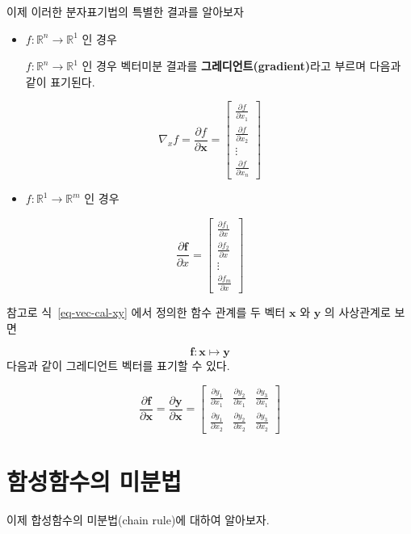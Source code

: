\documentclass[
  11pt,
  a4paper,
  oneside]{scrbook}
\providecommand{\tightlist}{%
  \setlength{\itemsep}{0pt}\setlength{\parskip}{0pt}}\usepackage{longtable,booktabs,array}
\newcommand{\RR}{\mathbb{R}}
\newcommand{\pardifftwo}[2]{\frac{\partial #1}{\partial #2 }}
\theoremstyle{definition}
\theoremstyle{plain}
\theoremstyle{definition}
\theoremstyle{definition}
\theoremstyle{remark}
\begin{document}
이제 이러한 분자표기법의 특별한 결과를 알아보자

\begin{itemize}
\item
  \(f: \RR^n \rightarrow \RR^1\) 인 경우

  \(f: \RR^n \rightarrow \RR^1\) 인 경우 벡터미분 결과를
  \textbf{그레디언트(gradient)}라고 부르며 다음과 같이 표기된다.
\end{itemize}

\[ 
\nabla_x f = \pardifftwo{ f}{\pmb x} = 
\begin{bmatrix} 
\pardifftwo{ f}{x_1} \\
\pardifftwo{ f}{x_2} \\
\vdots \\ 
\pardifftwo{ f}{x_n} 
\end{bmatrix} 
\]

\begin{itemize}
\tightlist
\item
  \(f: \RR^1 \rightarrow \RR^m\) 인 경우
\end{itemize}

\[ 
\pardifftwo{\pmb f}{x} = 
\begin{bmatrix} 
\pardifftwo{ f_1}{x} \\
\pardifftwo{ f_2}{x} \\
\vdots \\
\pardifftwo{ f_m}{x} 
\end{bmatrix} 
\]

참고로 식~\ref{eq-vec-cal-xy} 에서 정의한 함수 관계를 두 벡터 \(\pmb x\)
와 \(\pmb y\) 의 사상관계로 보면

\[ \pmb f : \pmb x \mapsto \pmb y \] 다음과 같이 그레디언트 벡터를
표기할 수 있다.

\[  \pardifftwo{ \pmb f}{\pmb x} = \pardifftwo{ \pmb y}{\pmb x}
=
\begin{bmatrix}
\pardifftwo{  y_1}{ x_1} &  \pardifftwo{  y_2}{ x_1} &  \pardifftwo{  y_3}{ x_1}  \\
\pardifftwo{  y_1}{ x_2} &  \pardifftwo{  y_2}{ x_2}  &  \pardifftwo{  y_3}{ x_2} 
\end{bmatrix}
\]

\section{함성함수의
미분법}\label{uxd568uxc131uxd568uxc218uxc758-uxbbf8uxbd84uxbc95}

이제 합성함수의 미분법(chain rule)에 대하여 알아보자.
\end{document}
